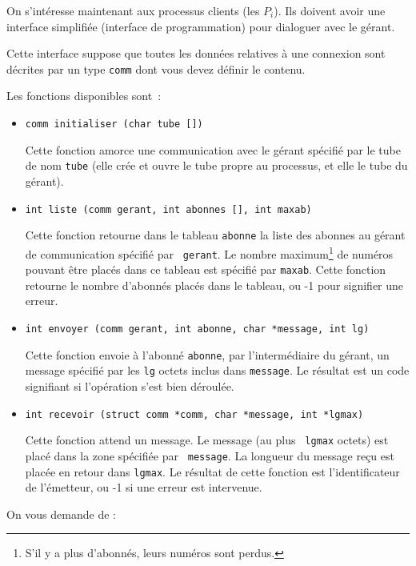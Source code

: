 \question

On s'intéresse maintenant aux processus clients (les $P_i$). Ils
doivent avoir une interface simplifiée (interface de programmation)
pour dialoguer avec le gérant.

Cette interface suppose que toutes les données relatives à une
connexion sont décrites par un type {\tt comm} dont vous devez
définir le contenu.

Les fonctions disponibles sont~:

\begin {itemize}

    \item \verb:comm initialiser (char tube []):

	Cette fonction amorce une communication avec le gérant spécifié
	par le tube de nom {\tt tube} (elle crée et ouvre le tube propre
	au processus, et elle le tube du gérant).

    \item \verb:int liste (comm gerant, int abonnes [], int maxab):

	Cette fonction retourne dans le tableau {\tt abonne} la liste
	des abonnes au gérant de communication spécifié par {\tt
	gerant}.  Le nombre maximum\footnote {S'il y a plus d'abonnés,
	leurs numéros sont perdus.} de numéros pouvant être placés dans
	ce tableau est spécifié par {\tt maxab}. Cette fonction retourne
	le nombre d'abonnés placés dans le tableau, ou -1 pour signifier
	une erreur.
    
    \item \verb:int envoyer (comm gerant, int abonne, char *message, int lg):

	Cette fonction envoie à l'abonné {\tt abonne}, par
	l'intermédiaire du gérant, un message spécifié par les {\tt lg}
	octets inclus dans {\tt message}.  Le résultat est un code
	signifiant si l'opération s'est bien déroulée.

    \item \verb:int recevoir (struct comm *comm, char *message, int *lgmax):

	Cette fonction attend un message. Le message (au plus {\tt
	lgmax} octets) est placé dans la zone spécifiée par {\tt
	message}. La longueur du message reçu est placée en retour dans
	{\tt lgmax}. Le résultat de cette fonction est l'identificateur
	de l'émetteur, ou -1 si une erreur est intervenue.

\end {itemize}

On vous demande de :

